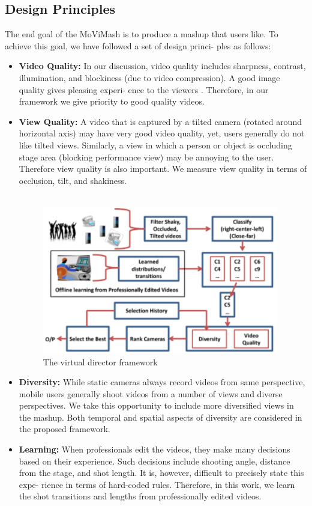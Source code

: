 \documentclass{sig-alternate}
\begin{document}
\subsection{Design Principles}
The end goal of the MoViMash is to produce a mashup that users
like. To achieve this goal, we have followed a set of design princi-
ples as follows:
\begin{itemize}
    \item \textbf{Video Quality:} In our discussion, video quality includes
sharpness, contrast, illumination, and blockiness (due to video
compression). A good image quality gives pleasing experi-
ence to the viewers \cite{10}. Therefore, in our framework we
give priority to good quality videos.

    \item \textbf{View Quality:} A video that is captured by a tilted camera
(rotated around horizontal axis) may have very good video
quality, yet, users generally do not like tilted views. Similarly, a view in which a person or object is occluding stage area (blocking performance view) may be annoying to the user. Therefore view quality is also important. We measure view quality in terms of occlusion, tilt, and shakiness.\\\\
\begin{figure}
    \centering
    \includegraphics{img2.png}
    \caption{The virtual director framework}
    \label{fig:my_label}
\end{figure}

    \item \textbf{Diversity: }While static cameras always record videos from
same perspective, mobile users generally shoot videos from
a number of views and diverse perspectives. We take this
opportunity to include more diversified views in the mashup.
Both temporal and spatial aspects of diversity are considered
in the proposed framework.
    \item \textbf{Learning:} When professionals edit the videos, they make
many decisions based on their experience. Such decisions
include shooting angle, distance from the stage, and shot
length. It is, however, difficult to precisely state this expe-
rience in terms of hard-coded rules. Therefore, in this work,
we learn the shot transitions and lengths from professionally
edited videos.
\end{itemize}
\end{document}
